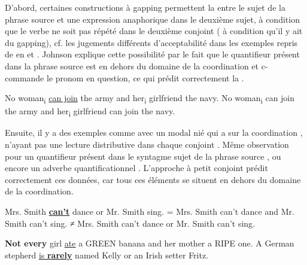 D’abord, certaines constructions à gapping permettent la  entre le sujet de la phrase source et une expression anaphorique dans le deuxième sujet, à condition que le verbe ne soit pas répété dans le deuxième conjoint ({\cad} à condition qu’il y ait du gapping), cf. les jugements différents d’acceptabilité dans les exemples repris de \citet{Johnson2000,Johnson2009} en  et . Johnson explique cette possibilité par le fait que le quantifieur présent dans la phrase source est en dehors du domaine de la coordination et c-commande le pronom en question, ce qui prédit correctement la . 

\ea \label{ch2:ex190}
\ea No woman\textsubscript{i} \uline{can join} the army and her\textsubscript{i} girlfriend the navy. \label{ch2:ex190a}     
\ex *No woman\textsubscript{i} can join the army and her\textsubscript{i} girlfriend can join the navy. \label{ch2:ex190b} 
\z
\z

Ensuite, il y a des exemples comme  avec un modal nié qui a  sur la coordination , n’ayant pas une lecture distributive dans chaque con\-joint . Même observation pour un quantifieur présent dans le syntagme sujet de la phrase source , ou encore un adverbe quantificationnel . L’approche à petit conjoint prédit correctement ces données, car tous ces éléments se situent en dehors du domaine de la coordination. 

 
\ea \label{ch2:ex191}
Mrs. Smith \uline{\textbf{can’t}} dance or Mr. Smith sing. 
\ea = Mrs. Smith can’t dance and Mr. Smith can’t sing. \label{ch2:ex191a}
\ex ≠ Mrs. Smith can’t dance or Mr. Smith can’t sing. \label{ch2:ex191b}
\z
\z

\ea \label{ch2:ex192}
\ea \textbf{Not every} girl \uline{ate} a GREEN banana and her mother a RIPE one. \label{ch2:ex192a}      
\ex A German stepherd \uline{is \textbf{rarely}} named Kelly or an Irish setter Fritz. \label{ch2:ex192b}
\z
\z

